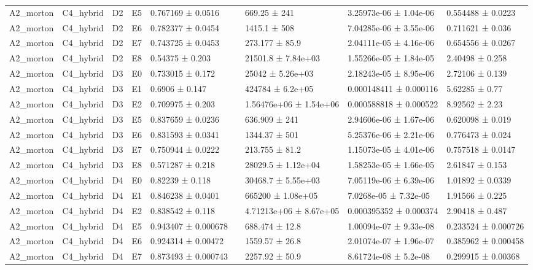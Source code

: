 \begin{table}
\begin{tabular}{lllllllll}
A2\_morton & C4\_hybrid & D2 & E5 & 0.767169 ± 0.0516 &  & 669.25 ± 241 & 3.25973e-06 ± 1.04e-06 & 0.554488 ± 0.0223 \\
A2\_morton & C4\_hybrid & D2 & E6 & 0.782377 ± 0.0454 &  & 1415.1 ± 508 & 7.04285e-06 ± 3.55e-06 & 0.711621 ± 0.036 \\
A2\_morton & C4\_hybrid & D2 & E7 & 0.743725 ± 0.0453 &  & 273.177 ± 85.9 & 2.04111e-05 ± 4.16e-06 & 0.654556 ± 0.0267 \\
A2\_morton & C4\_hybrid & D2 & E8 & 0.54375 ± 0.203 &  & 21501.8 ± 7.84e+03 & 1.55266e-05 ± 1.84e-05 & 2.40498 ± 0.258 \\
A2\_morton & C4\_hybrid & D3 & E0 & 0.733015 ± 0.172 &  & 25042 ± 5.26e+03 & 2.18243e-05 ± 8.95e-06 & 2.72106 ± 0.139 \\
A2\_morton & C4\_hybrid & D3 & E1 & 0.6906 ± 0.147 &  & 424784 ± 6.2e+05 & 0.000148411 ± 0.000116 & 5.62285 ± 0.77 \\
A2\_morton & C4\_hybrid & D3 & E2 & 0.709975 ± 0.203 &  & 1.56476e+06 ± 1.54e+06 & 0.000588818 ± 0.000522 & 8.92562 ± 2.23 \\
A2\_morton & C4\_hybrid & D3 & E5 & 0.837659 ± 0.0236 &  & 636.909 ± 241 & 2.94606e-06 ± 1.67e-06 & 0.620098 ± 0.019 \\
A2\_morton & C4\_hybrid & D3 & E6 & 0.831593 ± 0.0341 &  & 1344.37 ± 501 & 5.25376e-06 ± 2.21e-06 & 0.776473 ± 0.024 \\
A2\_morton & C4\_hybrid & D3 & E7 & 0.750944 ± 0.0222 &  & 213.755 ± 81.2 & 1.15073e-05 ± 4.01e-06 & 0.757518 ± 0.0147 \\
A2\_morton & C4\_hybrid & D3 & E8 & 0.571287 ± 0.218 &  & 28029.5 ± 1.12e+04 & 1.58253e-05 ± 1.66e-05 & 2.61847 ± 0.153 \\
A2\_morton & C4\_hybrid & D4 & E0 & 0.82239 ± 0.118 &  & 30468.7 ± 5.55e+03 & 7.05119e-06 ± 6.39e-06 & 1.01892 ± 0.0339 \\
A2\_morton & C4\_hybrid & D4 & E1 & 0.846238 ± 0.0401 &  & 665200 ± 1.08e+05 & 7.0268e-05 ± 7.32e-05 & 1.91566 ± 0.225 \\
A2\_morton & C4\_hybrid & D4 & E2 & 0.838542 ± 0.118 &  & 4.71213e+06 ± 8.67e+05 & 0.000395352 ± 0.000374 & 2.90418 ± 0.487 \\
A2\_morton & C4\_hybrid & D4 & E5 & 0.943407 ± 0.000678 &  & 688.474 ± 12.8 & 1.00094e-07 ± 9.33e-08 & 0.233524 ± 0.000726 \\
A2\_morton & C4\_hybrid & D4 & E6 & 0.924314 ± 0.00472 &  & 1559.57 ± 26.8 & 2.01074e-07 ± 1.96e-07 & 0.385962 ± 0.000458 \\
A2\_morton & C4\_hybrid & D4 & E7 & 0.873493 ± 0.000743 &  & 2257.92 ± 50.9 & 8.61724e-08 ± 5.2e-08 & 0.299915 ± 0.00368 \\

\end{tabular}
\end{table}
